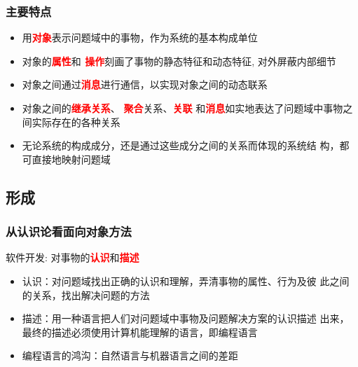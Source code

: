 \documentclass[compress]{beamer}
\begin{document}
\begin{frame}
  \frametitle{主要特点}
  \begin{itemize}
    \item 用\textbf{\textcolor{red}{对象}}表示问题域中的事物，作为系统的基本构成单位
    \item 对象的\textbf{\textcolor{red}{属性}}和\textbf{\textcolor{red}{
      操作}}刻画了事物的静态特征和动态特征, 对外屏蔽内部细节
    \item 对象之间通过\textbf{\textcolor{red}{消息}}进行通信，以实现对象之间的动态联系
    \item 对象之间的\textcolor{red}{\textbf{继承关系}}、
      \textcolor{red}{\textbf{聚合}}关系、\textcolor{red}{\textbf{关联}}
      和\textcolor{red}{\textbf{消息}}如实地表达了问题域中事物之间实际存在的各种关系
    \item 无论系统的构成成分，还是通过这些成分之间的关系而体现的系统结
      构，都可直接地映射问题域
  \end{itemize}
\end{frame}


\subsection{形成}

\begin{frame}
  \frametitle{从认识论看面向对象方法}
  \begin{block}{软件开发: 对事物的\textcolor{red}{\textbf{认识}}和\textcolor{red}{\textbf{描述
    }}}
    \begin{itemize}
      \item 认识：对问题域找出正确的认识和理解，弄清事物的属性、行为及彼
        此之间的关系，找出解决问题的方法
      \item 描述：用一种语言把人们对问题域中事物及问题解决方案的认识描述
        出来，最终的描述必须使用计算机能理解的语言，即编程语言
      \item 编程语言的鸿沟：自然语言与机器语言之间的差距
    \end{itemize}
  \end{block}
\end{frame}
\end{document}
